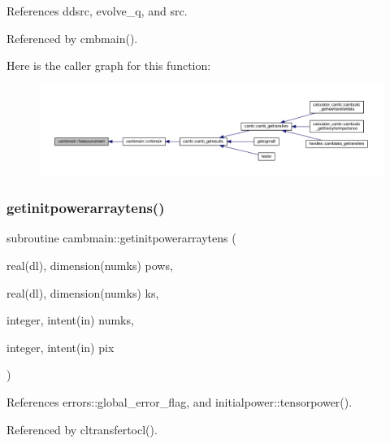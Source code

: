 References ddsrc, evolve\+\_\+q, and src.



Referenced by cmbmain().

Here is the caller graph for this function\+:
\nopagebreak
\begin{figure}[H]
\begin{center}
\leavevmode
\includegraphics[width=350pt]{namespacecambmain_a47cd48fe0174b214ddc23bcdd91b6754_icgraph}
\end{center}
\end{figure}
\mbox{\label{namespacecambmain_af4005843871d59b0973861e895fdb0d3}} 
\subsubsection{\texorpdfstring{getinitpowerarraytens()}{getinitpowerarraytens()}}
{\footnotesize\ttfamily subroutine cambmain\+::getinitpowerarraytens (\begin{DoxyParamCaption}\item[{real(dl), dimension(numks)}]{pows,  }\item[{real(dl), dimension(numks)}]{ks,  }\item[{integer, intent(in)}]{numks,  }\item[{integer, intent(in)}]{pix }\end{DoxyParamCaption})\hspace{0.3cm}{\ttfamily [private]}}



References errors\+::global\+\_\+error\+\_\+flag, and initialpower\+::tensorpower().



Referenced by cltransfertocl().

